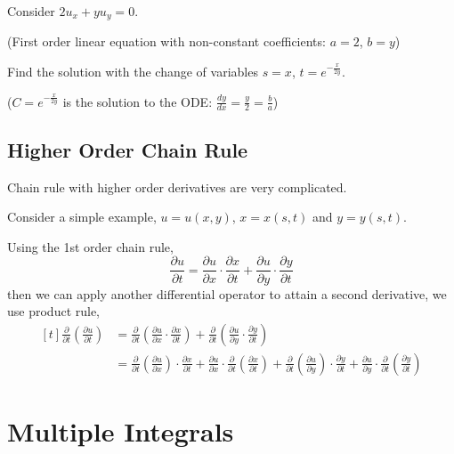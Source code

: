 \documentclass[11pt,fleqn]{book} %
\begin{document}
\begin{exercise}
    Consider $2u_x + yu_y = 0$.

    (First order linear equation with non-constant coefficients: $a = 2$, $b = y$) 

    Find the solution with the change of variables $s = x$, $t = e^{-\frac{x}{2y}}$.

    ($C = e^{-\frac{x}{2y}}$ is the solution to the ODE: $\frac{dy}{dx} = \frac{y}{2} = \frac{b}{a}$)
\end{exercise}

\section{Higher Order Chain Rule}

Chain rule with higher order derivatives are very complicated. 

Consider a simple example, $u = u(x, y)$, $x = x(s, t)$ and $y = y(s, t)$. 

Using the 1st order chain rule, $$\frac{\partial u}{\partial t} = \frac{\partial u}{\partial x} \cdot \frac{\partial x}{\partial t} + \frac{\partial u}{\partial y} \cdot \frac{\partial y}{\partial t}$$ then we can apply another differential operator to attain a second derivative, we use product rule, $$\begin{aligned}[t]
    \frac{\partial}{\partial t}\left(\frac{\partial u}{\partial t}\right) & = \frac{\partial}{\partial t} \left( \frac{\partial u}{\partial x} \cdot \frac{\partial x}{\partial t} \right) + \frac{\partial}{\partial t}\left( \frac{\partial u}{\partial y} \cdot \frac{\partial y}{\partial t} \right) \\
     & = \frac{\partial}{\partial t} \left( \frac{\partial u}{\partial x} \right) \cdot \frac{\partial x}{\partial t} + \frac{\partial u}{\partial x} \cdot \frac{\partial}{\partial t}\left( \frac{\partial x}{\partial t} \right) + \frac{\partial}{\partial t} \left( \frac{\partial u}{\partial y} \right) \cdot \frac{\partial y}{\partial t} + \frac{\partial u}{\partial y} \cdot \frac{\partial }{\partial t} \left( \frac{\partial y}{\partial t} \right)
\end{aligned}$$



\chapter{Multiple Integrals}
\end{document}
